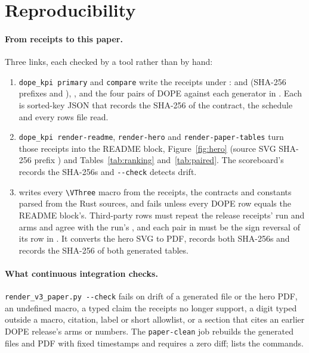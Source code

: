 \section{Reproducibility}\label{sec:repro}

\paragraph{From receipts to this paper.}
Three links, each checked by a tool rather than by hand:
{\sloppy %
\begin{enumerate}
  \item \texttt{dope\_kpi primary} and \texttt{compare} write the receipts under :  and  (SHA-256 prefixes \texttt{} and \texttt{}), , and the four pairs of DOPE against each generator in . Each is sorted-key JSON that records the SHA-256 of the contract, the schedule and every rows file read.
  \item \texttt{dope\_kpi render-readme}, \texttt{render-hero} and \texttt{render-paper-tables} turn those receipts into the README block, Figure~\ref{fig:hero} (source SVG SHA-256 prefix \texttt{}) and Tables~\ref{tab:ranking} and~\ref{tab:paired}. The scoreboard's  records the SHA-256s and  \texttt{-{}-check} detects drift.
  \item {} writes every \texttt{\textbackslash VThree} macro from the receipts, the contracts and constants parsed from the Rust sources, and fails unless every DOPE row equals the README block's. Third-party rows must repeat the release receipts' run and arms and agree with the run's , and each pair in  must be the sign reversal of its row in . It converts the hero SVG to PDF, records both SHA-256s and records the SHA-256 of both generated tables.
\end{enumerate}\par}

\paragraph{What continuous integration checks.}
\texttt{render\_v3\_paper.py -{}-check} fails on drift of a generated file or the hero PDF, an undefined macro, a typed claim the receipts no longer support, a digit typed outside a macro, citation, label or short allowlist, or a section that cites an earlier DOPE release's arms or numbers.
The \texttt{paper-clean} job rebuilds the generated files and PDF with fixed timestamps and requires a zero diff;  lists the commands.
